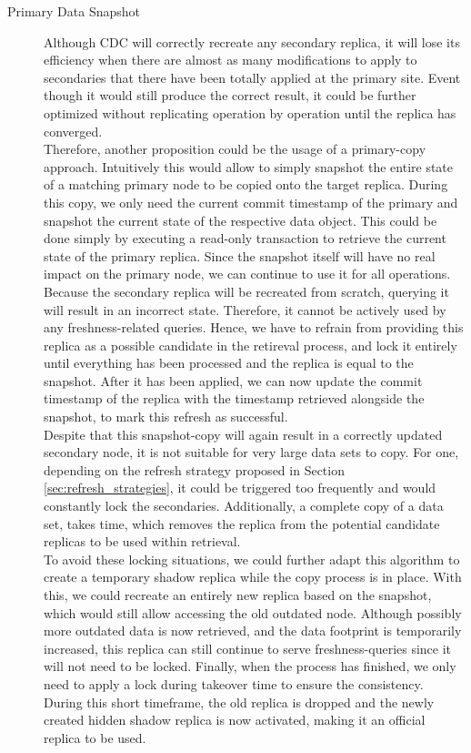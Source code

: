 \begin{description}
    \item [Primary Data Snapshot]
    Although CDC will correctly recreate any secondary replica, it will lose its efficiency when there are almost as many modifications to apply to secondaries that there 
    have been totally applied at the primary site. Event though it would still produce the correct result, it could be further optimized without replicating operation by operation 
    until the replica has converged.\\
    Therefore, another proposition could be the usage of a primary-copy approach. 
    Intuitively this would allow to simply snapshot the entire state of a matching primary node to be copied onto the target replica.
    During this copy, we only need the current commit timestamp of the primary and snapshot the current state of the respective data object. 
    This could be done simply by executing a read-only transaction to retrieve the current state of the primary replica.
    Since the snapshot itself will have no real impact on the primary node, we can continue to use it for all operations.
    Because the secondary replica will be recreated from scratch, querying it will result in an incorrect state. 
    Therefore, it cannot be actively used by any freshness-related queries.
    Hence, we have to refrain from providing this replica as a possible candidate in the retireval process, and lock it entirely 
    until everything has been processed and the replica is equal to the snapshot. After it has been applied, we can now update the commit timestamp of the replica
    with the timestamp retrieved alongside the snapshot, to mark this refresh as successful.\\
    Despite that this snapshot-copy will again result in a correctly updated secondary node, it is not suitable for very large data sets to copy.  
    For one, depending on the refresh strategy proposed in Section \ref{sec:refresh_strategies}, it could be triggered too frequently and would constantly lock the 
    secondaries. Additionally, a complete copy of a data set, takes time, which removes the replica from the potential candidate replicas to be used within retrieval.\\
    To avoid these locking situations, we could further adapt this algorithm to create a temporary shadow replica while the copy process is in place.
    With this, we could recreate an entirely new replica based on the snapshot, which would still allow accessing the old outdated node.
    Although possibly more outdated data is now retrieved, and the data footprint is temporarily increased, this replica can still continue to serve freshness-queries 
    since it will not need to be locked.
    Finally, when the process has finished, we only need to apply a lock during takeover time to ensure the consistency. During this short timeframe, the old replica is dropped
    and the newly created hidden shadow replica is now activated, making it an official replica to be used.




\end{description}
